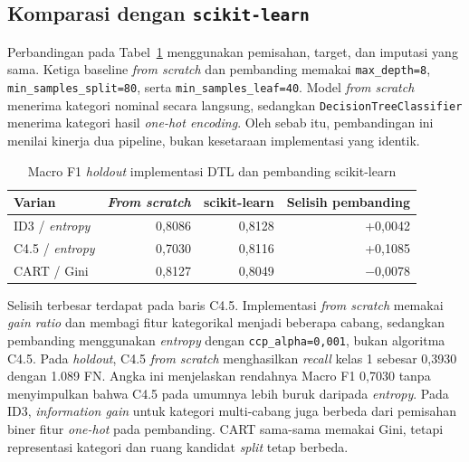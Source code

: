 \subsection{Komparasi dengan \texttt{scikit-learn}}

Perbandingan pada Tabel~\ref{tab-dtl-sklearn} menggunakan pemisahan, target, dan imputasi yang sama. Ketiga baseline \textit{from scratch} dan pembanding memakai \texttt{max\_depth=8}, \texttt{min\_samples\_split=80}, serta \texttt{min\_samples\_leaf=40}. Model \textit{from scratch} menerima kategori nominal secara langsung, sedangkan \texttt{DecisionTreeClassifier} menerima kategori hasil \textit{one-hot encoding}. Oleh sebab itu, pembandingan ini menilai kinerja dua pipeline, bukan kesetaraan implementasi yang identik.

\begin{table}[H]
    \centering
    \caption{Macro F1 \textit{holdout} implementasi DTL dan pembanding scikit-learn}
    \label{tab-dtl-sklearn}
    \begin{tabular}{lrrr}
        \hline
        Varian                  & \textit{From scratch} & scikit-learn & Selisih pembanding \\
        \hline
        ID3 / \textit{entropy}  & 0,8086                & 0,8128       & +0,0042            \\
        C4.5 / \textit{entropy} & 0,7030                & 0,8116       & +0,1085            \\
        CART / Gini             & 0,8127                & 0,8049       & $-$0,0078          \\
        \hline
    \end{tabular}
\end{table}

Selisih terbesar terdapat pada baris C4.5. Implementasi \textit{from scratch} memakai \textit{gain ratio} dan membagi fitur kategorikal menjadi beberapa cabang, sedangkan pembanding menggunakan \textit{entropy} dengan \texttt{ccp\_alpha=0,001}, bukan algoritma C4.5. Pada \textit{holdout}, C4.5 \textit{from scratch} menghasilkan \textit{recall} kelas 1 sebesar 0,3930 dengan 1.089 FN. Angka ini menjelaskan rendahnya Macro F1 0,7030 tanpa menyimpulkan bahwa C4.5 pada umumnya lebih buruk daripada \textit{entropy}. Pada ID3, \textit{information gain} untuk kategori multi-cabang juga berbeda dari pemisahan biner fitur \textit{one-hot} pada pembanding. CART sama-sama memakai Gini, tetapi representasi kategori dan ruang kandidat \textit{split} tetap berbeda.

